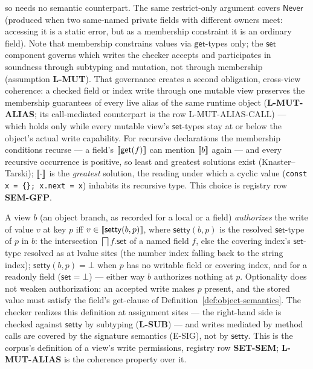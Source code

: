 \documentclass[11pt]{article}
\begin{document}
\begin{definition}
so needs no semantic counterpart. The same restrict-only argument covers
$\mathsf{Never}$ (produced when two same-named private fields with different
owners meet: accessing it is a static error, but as a membership constraint
it is an ordinary field). Note that membership constrains values via
$\mathsf{get}$-types only; the $\mathsf{set}$ component governs which writes
the checker accepts and participates in soundness through subtyping and
mutation, not through membership (assumption \textbf{L-MUT}). That
governance creates a second obligation, cross-view coherence: a checked
field or index write through one mutable view preserves the membership
guarantees of every live alias of the same runtime object
(\textbf{L-MUT-ALIAS}; its call-mediated counterpart is the row
L-MUT-ALIAS-CALL) — which holds only while every mutable view's
$\mathsf{set}$-types stay at or below the object's actual write
capability.
For recursive declarations the membership conditions recurse — a field's
$\llbracket \mathsf{get}(f) \rrbracket$ can mention $\llbracket b \rrbracket$ again — and every recursive
occurrence is positive, so least and greatest solutions exist
(Knaster--Tarski); $\llbracket \cdot \rrbracket$ is the \emph{greatest} solution, the
reading under which a cyclic value (\texttt{const x = \{\}; x.next = x})
inhabits its recursive type. This choice is registry row \textbf{SEM-GFP}.
\end{definition}

\begin{definition}
\label{def:write-auth}
A view $b$ (an object branch, as recorded for a local or a field)
\emph{authorizes} the write of value $v$ at key $p$ iff
$v \in \llbracket \mathsf{setty}(b,p) \rrbracket$, where $\mathsf{setty}(b,p)$ is the
resolved $\mathsf{set}$-type of $p$ in $b$: the intersection
$\bigsqcap f.\mathsf{set}$ of a named field $f$, else the covering
index's $\mathsf{set}$-type resolved as at lvalue sites (the number
index falling back to the string index); $\mathsf{setty}(b,p) = \bot$
when $p$ has no writable field or covering index, and for a readonly
field ($\mathsf{set} = \bot$) — either way $b$ authorizes nothing at
$p$. Optionality does not weaken authorization: an accepted write makes
$p$ present, and the stored value must satisfy the field's get-clause of
Definition~\ref{def:object-semantics}. The checker realizes this
definition at assignment
sites — the right-hand side is checked against $\mathsf{setty}$ by
subtyping (\textbf{L-SUB}) — and writes mediated by method calls are
covered by the signature semantics (E-SIG), not by $\mathsf{setty}$.
This is the corpus's definition of a view's write permissions, registry row
\textbf{SET-SEM}; \textbf{L-MUT-ALIAS} is the coherence property over
it.
\end{definition}
\end{document}
